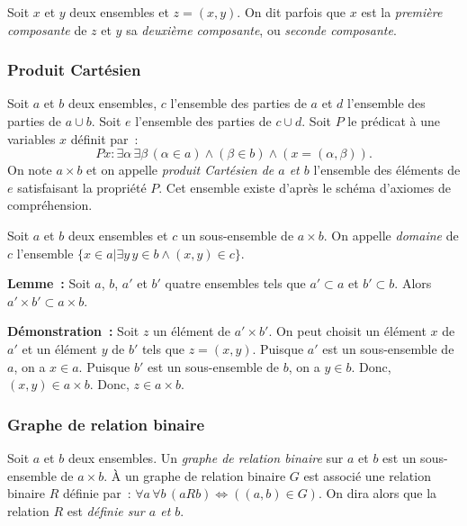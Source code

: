 \medskip

Soit $x$ et $y$ deux ensembles et $z = (x,y)$. 
On dit parfois que $x$ est la \textit{première composante} de $z$ et $y$ sa \textit{deuxième composante}, ou \textit{seconde composante}.

\subsubsection{Produit Cartésien}

Soit $a$ et $b$ deux ensembles, $c$ l'ensemble des parties de $a$ et $d$ l'ensemble des parties de $a \cup b$. 
Soit $e$ l'ensemble des parties de $c \cup d$. 
Soit $P$ le prédicat à une variables $x$ définit par : 
\begin{equation*}
    P x: \exists \alpha \, \exists \beta \, (\alpha \in a) \wedge (\beta \in b) \wedge (x = (\alpha, \beta)).
\end{equation*}
On note $a \times b$ et on appelle \textit{produit Cartésien de $a$ et $b$} l'ensemble des éléments de $e$ satisfaisant la propriété $P$. 
Cet ensemble existe d'après le schéma d'axiomes de compréhension. 

Soit $a$ et $b$ deux ensembles et $c$ un sous-ensemble de $a \times b$. 
On appelle \textit{domaine} de $c$ l'ensemble $\lbrace x \in a \vert \exists y \, y \in b \wedge (x,y) \in c \rbrace$. 

\medskip

\noindent\textbf{Lemme :} Soit $a$, $b$, $a'$ et $b'$ quatre ensembles tels que $a' \subset a$ et $b' \subset b$. 
    Alors $a' \times b' \subset a \times b$.

\medskip

\noindent\textbf{Démonstration :}
    Soit $z$ un élément de $a' \times b'$. 
    On peut choisit un élément $x$ de $a'$ et un élément $y$ de $b'$ tels que $z = (x,y)$.
    Puisque $a'$ est un sous-ensemble de $a$, on a $x \in a$.
    Puisque $b'$ est un sous-ensemble de $b$, on a $y \in b$. 
    Donc, $(x,y) \in a \times b$.
    Donc, $z \in a \times b$.

   \done 

\subsubsection{Graphe de relation binaire}

Soit $a$ et $b$ deux ensembles. 
Un \textit{graphe de relation binaire} sur $a$ et $b$ est un sous-ensemble de $a \times b$. 
À un graphe de relation binaire $G$ est associé une relation binaire $R$ définie par : $\forall a \, \forall b \, (a R b) \Leftrightarrow ((a,b) \in G)$. 
On dira alors que la relation $R$ est \textit{définie sur $a$ et $b$}.

